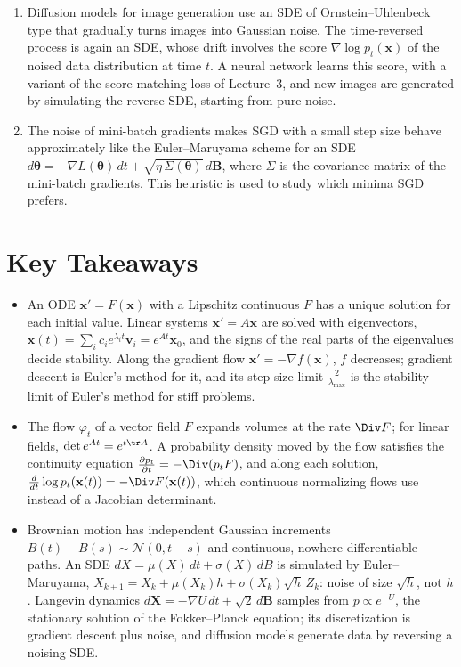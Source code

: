 \begin{remark}
    \begin{enumerate}
        \item Diffusion models for image generation use an SDE of Ornstein--Uhlenbeck type that gradually turns images into Gaussian noise. The time-reversed process is again an SDE, whose drift involves the score $\nabla\log p_t(\mathbf{x})$ of the noised data distribution at time $t$. A neural network learns this score, with a variant of the score matching loss of Lecture~3, and new images are generated by simulating the reverse SDE, starting from pure noise.
        \item The noise of mini-batch gradients makes SGD with a small step size behave approximately like the Euler--Maruyama scheme for an SDE $d\boldsymbol{\theta} = -\nabla L(\boldsymbol{\theta})\,dt + \sqrt{\eta\,\Sigma(\boldsymbol{\theta})}\,d\mathbf{B}$, where $\Sigma$ is the covariance matrix of the mini-batch gradients. This heuristic is used to study which minima SGD prefers.
    \end{enumerate}
\end{remark}

\section{Key Takeaways}
\begin{itemize}[leftmargin=*]
    \item An ODE $\mathbf{x}' = F(\mathbf{x})$ with a Lipschitz continuous $F$ has a unique solution for each initial value. Linear systems $\mathbf{x}' = A\mathbf{x}$ are solved with eigenvectors, $\mathbf{x}(t) = \sum_i c_ie^{\lambda_i t}\mathbf{v}_i = e^{At}\mathbf{x}_0$, and the signs of the real parts of the eigenvalues decide stability. Along the gradient flow $\mathbf{x}' = -\nabla f(\mathbf{x})$, $f$ decreases; gradient descent is Euler's method for it, and its step size limit $\frac{2}{\lambda_{\max}}$ is the stability limit of Euler's method for stiff problems.
    \item The flow $\varphi_t$ of a vector field $F$ expands volumes at the rate $\Div F$; for linear fields, $\det e^{At} = e^{t\tr A}$. A probability density moved by the flow satisfies the continuity equation $\frac{\partial p_t}{\partial t} = -\Div(p_tF)$, and along each solution, $\frac{d}{dt}\log p_t(\mathbf{x}(t)) = -\Div F(\mathbf{x}(t))$, which continuous normalizing flows use instead of a Jacobian determinant.
    \item Brownian motion has independent Gaussian increments $B(t) - B(s) \sim \mathcal{N}(0, t - s)$ and continuous, nowhere differentiable paths. An SDE $dX = \mu(X)\,dt + \sigma(X)\,dB$ is simulated by Euler--Maruyama, $X_{k+1} = X_k + \mu(X_k)h + \sigma(X_k)\sqrt{h}\,Z_k$: noise of size $\sqrt{h}$, not $h$. Langevin dynamics $d\mathbf{X} = -\nabla U\,dt + \sqrt{2}\,d\mathbf{B}$ samples from $p \propto e^{-U}$, the stationary solution of the Fokker--Planck equation; its discretization is gradient descent plus noise, and diffusion models generate data by reversing a noising SDE.
\end{itemize}

